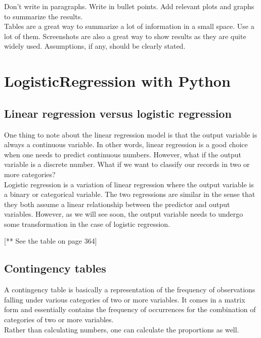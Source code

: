 \documentclass{article}
\numberwithin{equation}{section} %
\begin{document}
Don't write in paragraphs. Write in bullet points. Add relevant plots and graphs to
summarize the results. \\

Tables are a great way to summarize a lot of information in a small space. Use a lot of them. Screenshots are also a great way to show results as they are quite widely used. Assumptions, if any, should be clearly stated. \\


\newpage

\section{LogisticRegression with Python}

\subsection*{Linear regression versus logistic regression}

One thing to note about the linear regression model is that the output variable is
always a continuous variable. In other words, linear regression is a good choice
when one needs to predict continuous numbers. However, what if the output variable is a discrete number. What if we want to classify our records in two or more categories? \\

Logistic regression is a variation of linear regression where the output variable is a binary or categorical variable. The two regressions are similar in the sense that they both assume a linear relationship between the predictor and output variables. However, as we will see soon, the output variable needs to undergo some transformation in the case of logistic regression.

[** See the table on page 364]

\subsection*{Contingency tables}

A contingency table is basically a representation of the frequency of observations
falling under various categories of two or more variables. It comes in a matrix
form and essentially contains the frequency of occurrences for the combination of
categories of two or more variables. \\

Rather than calculating numbers, one can calculate the proportions as well. \\
\end{document}

